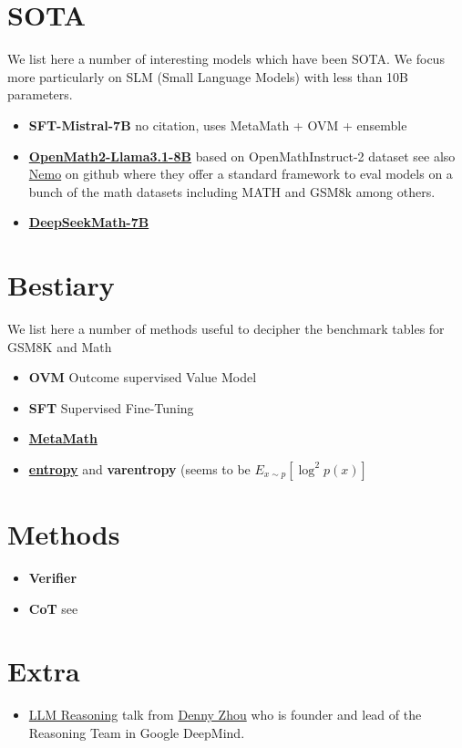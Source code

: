 \documentclass{article}
\begin{document}
\section{SOTA}
We list here a number of interesting models which have been SOTA. We focus more particularly on SLM (Small Language Models) with less than 10B parameters.
\begin{itemize}
\item \textbf{SFT-Mistral-7B} no citation, uses MetaMath + OVM + ensemble
\item \href{https://paperswithcode.com/paper/openmathinstruct-2-accelerating-ai-for-math}{\textbf{OpenMath2-Llama3.1-8B}} based on OpenMathInstruct-2 dataset \cite{omi2} see also \href{https://github.com/Kipok/NeMo-Skills/tree/main}{Nemo} on github where they offer a standard framework to eval models on a bunch of the math datasets including MATH and GSM8k among others.
\item \href{https://paperswithcode.com/paper/an-empirical-study-of-data-ability-boundary}{\textbf{DeepSeekMath-7B}}
\end{itemize}

\section{Bestiary}
We list here a number of methods useful to decipher the benchmark tables for GSM8K and Math
\begin{itemize}
\item \textbf{OVM} Outcome supervised Value Model \cite{OVM} 
\item \textbf{SFT} Supervised Fine-Tuning
\item \href{https://github.com/meta-math/MetaMath?search=1}{\textbf{MetaMath}}
\item \href{https://github.com/xjdr-alt/entropix}{\textbf{entropy}} and \textbf{varentropy} (seems to be $E_{x\sim p}\left[\log^2 p(x)\right]$
\end{itemize}

\section{Methods}
\begin{itemize}
\item \textbf{Verifier} \cite{cobbe}
\item \textbf{CoT} see \cite{wei} \cite{wang2024}
\end{itemize}

\section{Extra}
\begin{itemize}
\item \href{https://dennyzhou.github.io/LLM-Reasoning-Berkeley.pdf}{LLM Reasoning} talk from \href{https://dennyzhou.github.io/}{Denny Zhou} who is founder and lead of the Reasoning Team in Google DeepMind.
\end{itemize}



\end{document}

